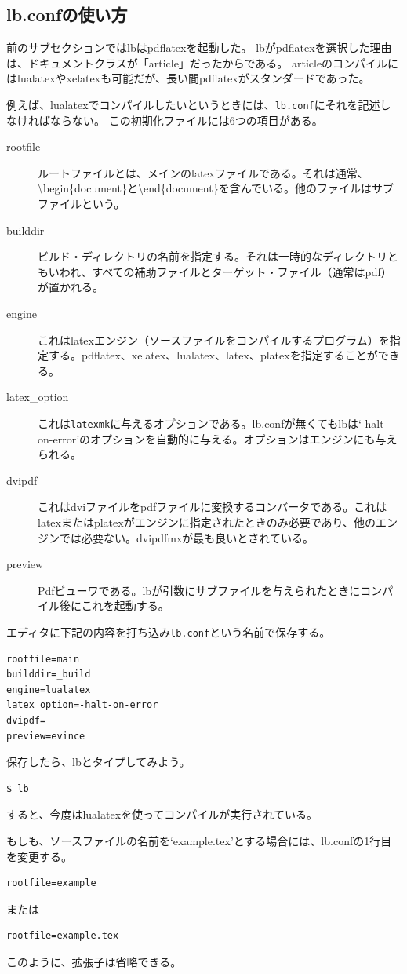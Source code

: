 \subsection{lb.confの使い方}
前のサブセクションではlbはpdflatexを起動した。
lbがpdflatexを選択した理由は、ドキュメントクラスが「article」だったからである。
articleのコンパイルにはlualatexやxelatexも可能だが、長い間pdflatexがスタンダードであった。

例えば、lualatexでコンパイルしたいというときには、\verb|lb.conf|にそれを記述しなければならない。
この初期化ファイルには6つの項目がある。
\begin{description}
\item[rootfile] ルートファイルとは、メインのlatexファイルである。それは通常、{\textbackslash}begin\{document\}と{\textbackslash}end\{document\}を含んでいる。他のファイルはサブファイルという。
\item[builddir] ビルド・ディレクトリの名前を指定する。それは一時的なディレクトリともいわれ、すべての補助ファイルとターゲット・ファイル（通常はpdf）が置かれる。
\item[engine] これはlatexエンジン（ソースファイルをコンパイルするプログラム）を指定する。pdflatex、xelatex、lualatex、latex、platexを指定することができる。
\item[latex\_option] これは\verb|latexmk|に与えるオプションである。lb.confが無くてもlbは`-halt-on-error'のオプションを自動的に与える。オプションはエンジンにも与えられる。
\item[dvipdf] これはdviファイルをpdfファイルに変換するコンバータである。これはlatexまたはplatexがエンジンに指定されたときのみ必要であり、他のエンジンでは必要ない。dvipdfmxが最も良いとされている。
\item[preview] Pdfビューワである。lbが引数にサブファイルを与えられたときにコンパイル後にこれを起動する。
\end{description}

エディタに下記の内容を打ち込み\verb|lb.conf|という名前で保存する。
\begin{verbatim}
rootfile=main
builddir=_build
engine=lualatex
latex_option=-halt-on-error
dvipdf=
preview=evince
\end{verbatim}
保存したら、lbとタイプしてみよう。
\begin{verbatim}
$ lb
\end{verbatim}
すると、今度はlualatexを使ってコンパイルが実行されている。

もしも、ソースファイルの名前を`example.tex'とする場合には、lb.confの1行目を変更する。
\begin{verbatim}
rootfile=example
\end{verbatim}
または
\begin{verbatim}
rootfile=example.tex
\end{verbatim}
このように、拡張子は省略できる。

